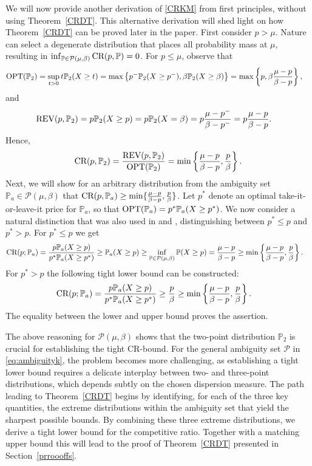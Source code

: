 \documentclass[11pt]{article}
\newcommand{\bP}{\mathbb{P}}
\newcommand{\cP}{\mathcal{P}}
\newcommand{\1}{\mathds{1}}
\begin{document}
We will now provide another derivation of \eqref{CRKM} from first principles, without using Theorem~\ref{CRDT}. This alternative derivation will shed light on how Theorem~\ref{CRDT} can be proved later in the paper.
First consider $p > \mu$. Nature can select a degenerate distribution that places all probability mass at $\mu$, resulting in $\inf_{\bP\in \cP(\mu,\beta)} \textup{CR}(p,\bP) = 0$.
For $p \leq \mu$, observe that
\begin{align}
\textup{OPT}(\bP_2) &= \sup_{t>0} t \bP_2(X \geq t) = \max\left\{p^-\bP_2(X \geq p^-), \beta\bP_2(X \geq \beta)\right\} = \max\left\{p, \beta\frac{\mu-p}{\beta-p}\right\},
\end{align}
and 
\begin{align}
    \textup{REV}(p,\bP_2) &= p\bP_2(X\geq p) = p\bP_2(X = \beta)=p\frac{\mu-p^-}{\beta-p^-} = p\frac{\mu-p}{\beta-p}.
\end{align}
Hence,
\begin{align}
    \textup{CR}(p,\bP_2) =
    \frac{\textup{REV}(p,\bP_2)}{\textup{OPT}(\bP_2)} = \min\left\{\frac{\mu-p}{\beta-p}, \frac{p}{\beta}\right\}.
\end{align}
Next, we will show for an arbitrary distribution from the ambiguity set 
$\bP_a \in \cP{(\mu, \beta)}$ that $\textup{CR}(p,\bP_a) \geq \min\{\frac{\mu-p}{\beta-p}, \frac{p}{\beta}\}$. Let $p^*$ denote an optimal take-it-or-leave-it price for $\bP_a$, so that $\textup{OPT}(\bP_a) = p^* \bP_a(X\geq p^*)$. 
We now consider a natural distinction that was also used in \cite{giannakopoulos2019robust} and \cite{chen2019distributionally}, distinguishing between $p^*\leq p$ and  $p^*> p$.
 For $p^* \leq p$ we get
\begin{align}
    \textup{CR}(p;\bP_a) &= \frac{p\bP_a(X\geq p)}{p^*\bP_a(X\geq p^*)} \geq \bP_a(X\geq p) \geq \inf_{\bP \in \cP{(\mu, \beta)}}\bP(X\geq p)=\frac{\mu-p}{\beta-p} \geq \min\left\{\frac{\mu-p}{\beta-p}, \frac{p}{\beta}\right\}.
\end{align}
For $p^* > p$ the following tight lower bound can be constructed:
\begin{align}
    \textup{CR}(p;\bP_a) &= \frac{p\bP_a(X \geq p)}{p^* \bP_a(X \geq p^*)} \geq
    \frac{p}{\beta} \geq \min\left\{\frac{\mu-p}{\beta-p}, \frac{p}{\beta}\right\}.\label{CRMR}
\end{align}
The equality between the lower and upper bound proves the assertion.

The above reasoning for $\cP(\mu,\beta)$ shows that the two-point distribution $\bP_2$ is crucial for establishing the tight CR-bound. For the general ambiguity set $\cP$ in \eqref{eq:ambiguityk}, the problem becomes more challenging, as establishing a tight lower bound requires a delicate interplay between two- and three-point distributions, which depends subtly on the chosen dispersion measure. The path leading to Theorem~\ref{CRDT} begins by identifying, for each of the three key quantities, the extreme distributions within the ambiguity set that yield the sharpest possible bounds. By combining these three extreme distributions, we derive a tight lower bound for the competitive ratio. Together with a matching upper bound this will lead to the proof of Theorem~\ref{CRDT} presented in Section~\ref{prroooffs}.
\end{document}
